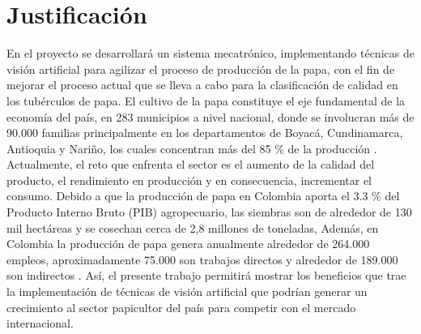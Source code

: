 \section{Justificación}

En el proyecto se desarrollará un sistema mecatrónico, implementando técnicas de visión artificial para agilizar el proceso de producción de la papa, con el fin de mejorar el proceso actual que se lleva a cabo para la clasificación de calidad en los tubérculos de papa. El cultivo de la papa constituye el eje fundamental de la economía del país, en 283 municipios a nivel nacional, donde se involucran más de 90.000 familias principalmente en los departamentos de Boyacá, Cundinamarca, Antioquia y Nariño, los cuales concentran más del 85 \% de la producción \cite{referencia1}. Actualmente, el reto que enfrenta el sector es el aumento de la calidad del producto, el rendimiento en producción y en consecuencia, incrementar el consumo. Debido a que la producción de papa en Colombia aporta el 3.3 \% del Producto Interno Bruto (PIB) agropecuario, las siembras son de alrededor de 130 mil hectáreas y se cosechan cerca de 2,8 millones de toneladas, Además, en Colombia la producción de papa genera anualmente alrededor de 264.000 empleos, aproximadamente 75.000 son trabajos directos y alrededor de 189.000 son indirectos \cite{referencia2}.
Así, el presente trabajo permitirá mostrar los beneficios que trae la implementación de técnicas de visión artificial que podrían generar un  crecimiento al sector papicultor del país para competir con el mercado internacional.


